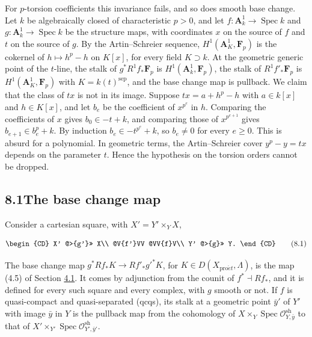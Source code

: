 \documentclass[11pt]{article}
\begin{document}
For \(p\)-torsion coefficients this invariance fails, and so does smooth base change. Let \(k\) be algebraically closed of characteristic \(p>0\), and let \(f:\mathbf A^1_k\to\operatorname{Spec}k\) and \(g:\mathbf A^1_k\to\operatorname{Spec}k\) be the structure maps, with coordinates \(x\) on the source of \(f\) and \(t\) on the source of \(g\). By the Artin–Schreier sequence, \(H^1(\mathbf A^1_K,\mathbf F_p)\) is the cokernel of \(h\mapsto h^p-h\) on \(K[x]\), for every field \(K\supset k\). At the geometric generic point of the \(t\)-line, the stalk of \(g^*R^1f_*\mathbf F_p\) is \(H^1(\mathbf A^1_k,\mathbf F_p)\), the stalk of \(R^1f'_*\mathbf F_p\) is \(H^1(\mathbf A^1_K,\mathbf F_p)\) with \(K=k(t)^{\mathrm{sep}}\), and the base change map is pullback. We claim that the class of \(tx\) is not in its image. Suppose \(tx=a+h^p-h\) with \(a\in k[x]\) and \(h\in K[x]\), and let \(b_e\) be the coefficient of \(x^{p^e}\) in \(h\). Comparing the coefficients of \(x\) gives \(b_0\in -t+k\), and comparing those of \(x^{p^{e+1}}\) gives \(b_{e+1}\in b_e^p+k\). By induction \(b_e\in -t^{p^e}+k\), so \(b_e\neq0\) for every \(e\geq0\). This is absurd for a polynomial. In geometric terms, the Artin–Schreier cover \(y^p-y=tx\) depends on the parameter \(t\). Hence the hypothesis on the torsion orders cannot be dropped.

\subsection*{\texorpdfstring{8.1\quad The base change map}{8.1 The base change map}}
\label{bp639}%
\label{bp640}%
Consider a cartesian square, with \(X'=Y'\times_YX\),

\[
\begin{CD}
X' @>{g'}>> X\\
@V{f'}VV @VV{f}V\\
Y' @>{g}>> Y.
\end{CD}
\tag{8.1}
\]

The base change map \(g^*Rf_*K\to Rf'_*g'^*K\), for \(K\in D(X_{\mathrm{pro}\acute{e}t},\Lambda)\), is the map (4.5) of Section \hyperref[bp290]{4.1}. It comes by adjunction from the counit of \(f^*\dashv Rf_*\), and it is defined for every such square and every complex, with \(g\) smooth or not. If \(f\) is quasi-compact and quasi-separated (qcqs), its stalk at a geometric point \(\bar y'\) of \(Y'\) with image \(\bar y\) in \(Y\) is the pullback map from the cohomology of \(X\times_Y\operatorname{Spec}\mathcal O^{\mathrm{sh}}_{Y,\bar y}\) to that of \(X'\times_{Y'}\operatorname{Spec}\mathcal O^{\mathrm{sh}}_{Y',\bar y'}\).
\end{document}
